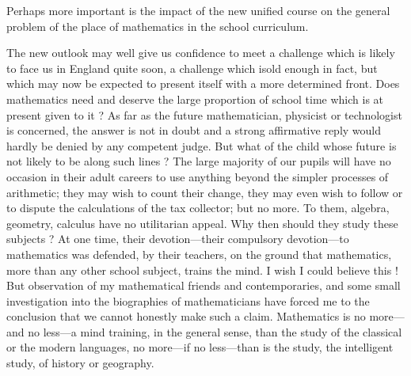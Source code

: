 Perhaps more important is the impact of the new unified course on the general problem of the place of mathematics in the school curriculum.

The new outlook may well give us confidence to meet a challenge which is likely to face us in England quite soon, a challenge which is\pageoriginale old enough in fact, but which may now be expected to present itself with a more determined front. Does mathematics need and deserve the large proportion of school time which is at present given to it ? As far as the future mathematician, physicist or technologist is concerned, the answer is not in doubt and a strong affirmative reply would hardly be denied by any competent judge. But what of the child whose future is not likely to be along such lines ? The large majority of our pupils will have no occasion in their adult careers to use anything beyond the simpler processes of arithmetic; they may wish to count their change, they may even wish to follow or to dispute the calculations of the tax collector; but no more. To them, algebra, geometry, calculus have no utilitarian appeal. Why then should they study these subjects ? At one time, their devotion---their compulsory devotion---to mathematics was defended, by their teachers, on the ground that mathematics, more than any other school subject, trains the mind. I wish I could believe this ! But observation of my mathematical friends and contemporaries, and some small investigation into the biographies of mathematicians have forced me to the conclusion that we cannot honestly make such a claim. Mathematics is no more---and no less---a mind training, in the general sense, than the study of the classical or the modern languages, no more---if no less---than is the study, the intelligent study, of history or geography.

